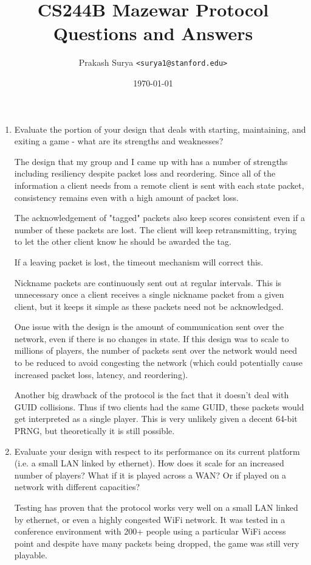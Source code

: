 \documentclass{article}
\title{CS244B Mazewar Protocol Questions and Answers}
\author{Prakash Surya \texttt{<surya1@stanford.edu>}}
\date{\today}
\begin{document}
\maketitle

\begin{enumerate}

\item Evaluate the portion of your design that deals with starting,
maintaining, and exiting a game - what are its strengths and weaknesses?

The design that my group and I came up with has a number of strengths
including resiliency despite packet loss and reordering. Since all of
the information a client needs from a remote client is sent with each
state packet, consistency remains even with a high amount of packet
loss.

The acknowledgement of "tagged" packets also keep scores consistent even
if a number of these packets are lost. The client will keep
retransmitting, trying to let the other client know he should be awarded
the tag.

If a leaving packet is lost, the timeout mechanism will correct this.

Nickname packets are continuously sent out at regular intervals. This is
unnecessary once a client receives a single nickname packet from a given
client, but it keeps it simple as these packets need not be
acknowledged.

One issue with the design is the amount of communication sent over the
network, even if there is no changes in state. If this design was to
scale to millions of players, the number of packets sent over the
network would need to be reduced to avoid congesting the network (which
could potentially cause increased packet loss, latency, and reordering).

Another big drawback of the protocol is the fact that it doesn't deal
with GUID collisions. Thus if two clients had the same GUID, these
packets would get interpreted as a single player. This is very unlikely
given a decent 64-bit PRNG, but theoretically it is still possible.

\item Evaluate your design with respect to its performance on its current
platform (i.e. a small LAN linked by ethernet). How does it scale for an
increased number of players? What if it is played across a WAN? Or if
played on a network with different capacities?

Testing has proven that the protocol works very well on a small LAN
linked by ethernet, or even a highly congested WiFi network. It was
tested in a conference environment with 200+ people using a particular
WiFi access point and despite have many packets being dropped, the game
was still very playable.


\end{enumerate}
\end{document}
